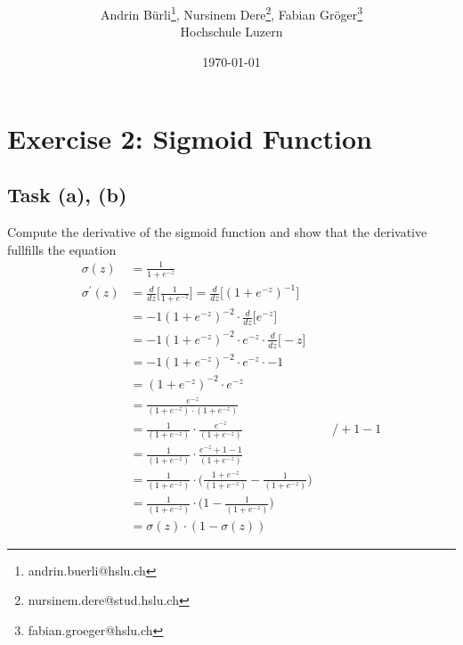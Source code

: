 \documentclass[onecolumn]{article}
\title{\spacecaps{Lab report: SW02 }\\ \normalsize \spacesc{TSM\_DeLearn} }
\author{Andrin Bürli\thanks{andrin.buerli@hslu.ch}, Nursinem Dere\thanks{nursinem.dere@stud.hslu.ch}, Fabian Gröger\thanks{fabian.groeger@hslu.ch}\\Hochschule Luzern}
\date{\today}
\begin{document}
\maketitle

\section{Exercise 2: Sigmoid Function}
\subsection{Task (a), (b)}
Compute the derivative of the sigmoid function and show that the derivative fullfills the equation
\begin{align*}
	\sigma(z) &= \frac{1}{1+e^{-z}} \\
	\sigma^\prime(z) &= \frac{d}{dz} \Bigg[ \frac{1}{1+e^{-z}} \Bigg] = \frac{d}{dz} \Bigg[ (1+e^{-z})^{-1} \Bigg] \\
	&= -1 (1+e^{-z})^{-2} \cdot \frac{d}{dz} \Big[ e^{-z} \Big] \\
	&= -1 (1+e^{-z})^{-2} \cdot e^{-z} \cdot \frac{d}{dz} \Big[ -z \Big] \\
	&= -1 (1+e^{-z})^{-2} \cdot e^{-z} \cdot -1 \\
	&= (1+e^{-z})^{-2} \cdot e^{-z} \\
	&= \frac{e^{-z}}{(1+e^{-z}) \cdot (1+e^{-z})} \\
	&= \frac{1}{(1+e^{-z})} \cdot \frac{e^{-z}}{(1+e^{-z})} && /+1 -1 \\
	&= \frac{1}{(1+e^{-z})} \cdot \frac{e^{-z} +1 -1}{(1+e^{-z})} \\
	&= \frac{1}{(1+e^{-z})} \cdot \Bigg(\frac{1+ e^{-z}}{(1+e^{-z})} - \frac{1}{(1+e^{-z})}\Bigg) \\
	&= \frac{1}{(1+e^{-z})} \cdot \Bigg(1 - \frac{1}{(1+e^{-z})}\Bigg) \\
	&= \sigma(z) \cdot (1 - \sigma(z))
\end{align*}
\end{document}
